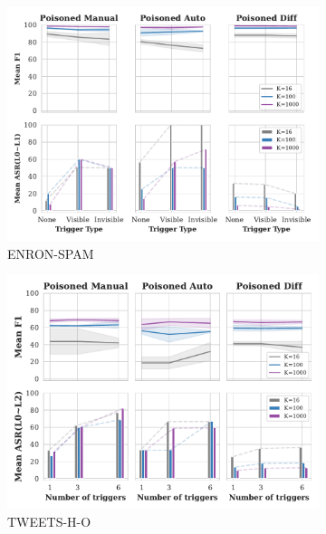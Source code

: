 \begin{figure}[!ht]
\begin{subfigure}{.33\textwidth}
  \includegraphics[width=\linewidth]{figures/evaluation_media/ENRON-SPAM_trigger_type_impacts.pdf}
  \caption{ENRON-SPAM}
  \label{fig:enron_spam_poison_ratio_impacts}
\end{subfigure}
\begin{subfigure}{.33\textwidth}
  \centering
  \includegraphics[width=\linewidth]{figures/evaluation_media/TWEETS-HATE-OFFENSIVE_num_trigger_impacts.pdf}
  \caption{TWEETS-H-O}
  \label{fig:tweets_trigger_impacts}
\end{subfigure}%
\begin{subfigure}{.33\textwidth}
  \centering

\end{subfigure}
\end{figure}
